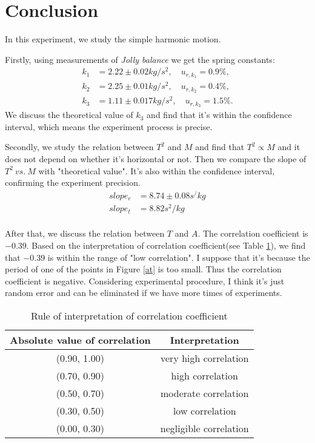 \section{Conclusion}
    In this experiment, we study the simple harmonic motion.
    
    Firstly, using measurements of \emph{Jolly balance} we get the spring constants:
    \[
    \begin{split}
        k_1&= 2.22\pm 0.02 kg/s^2,\quad u_{r,k_1}=0.9\%,\\
        k_2&= 2.25\pm 0.01 kg/s^2,\quad u_{r,k_2}=0.4\%,\\
        k_3&= 1.11\pm 0.017kg/s^2,\quad u_{r,k_3}=1.5\%.
    \end{split}
    \]
    We discuss the theoretical value of $k_3$ and find that it's within the confidence interval, which means the experiment process is precise.

    Secondly, we study the relation between $T^2$ and $M$ and find that $T^2\propto M$ and it does not depend on whether it's horizontal or not. Then we compare the slope of $T^2\ vs.\ M$ with "theoretical value". It's also within the confidence interval, confirming the experiment precision.
    \[
    \begin{split}
        slope_e&=8.74\pm 0.08s^/kg\\
        slope_t&=8.82s^2/kg\\
    \end{split}
    \]

    After that, we discuss the relation between $T$ and $A$. The correlation coefficient is $-0.39$. Based on the interpretation of correlation coefficient(see Table \ref{rule}), we find that $-0.39$ is within the range of "low correlation". I suppose that it's because the period of one of the points in Figure \ref{at} is too small. Thus the correlation coefficient is negative. Considering experimental procedure, I think it's just random error and can be eliminated if we have more times of experiments.
    \begin{table}
        \centering
        \begin{tabular}{|c|c|}
            \hline \hline
            \textbf{Absolute value of correlation} & \textbf{Interpretation} \\\hline
            (0.90, 1.00) & very high correlation\\\hline
            (0.70, 0.90) & high correlation\\\hline
            (0.50, 0.70) & moderate correlation\\\hline
            (0.30, 0.50) & low correlation\\\hline
            (0.00, 0.30) & negligible correlation\\\hline\hline
        \end{tabular}
        \caption{Rule of interpretation of correlation coefficient \cite{foo1}}\label{rule}
    \end{table}

